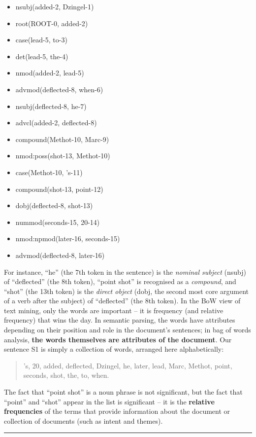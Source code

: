 \begin{itemize}[noitemsep]
\item nsubj(added-2, Dzingel-1)
\item root(ROOT-0, added-2)
\item case(lead-5, to-3)
\item det(lead-5, the-4)
\item nmod(added-2, lead-5)
\item advmod(deflected-8, when-6)
\item nsubj(deflected-8, he-7)
\item advcl(added-2, deflected-8)
\item compound(Methot-10, Marc-9)
\item nmod:poss(shot-13, Methot-10)
\item case(Methot-10, 's-11)
\item compound(shot-13, point-12)
\item dobj(deflected-8, shot-13)
\item nummod(seconds-15, 20-14)
\item nmod:npmod(later-16, seconds-15)
\item advmod(deflected-8, later-16)
\end{itemize}
For instance, ``he'' (the 7th token in the sentence) is the \textit{nominal subject} (nsubj) of ``deflected'' (the 8th token), ``point shot'' is recognised as a \textit{compound}, and ``shot'' (the 13th token) is the \textit{direct object} (dobj, the second most core argument of a verb after the subject) of ``deflected'' (the 8th token).
\newl In the BoW view of text mining, only the words are important -- it is frequency (and relative frequency) that wins the day. In semantic parsing, the words have attributes depending on their position and role in the document's sentences; in bag of words analysis, \textbf{the words themselves are attributes of the document}. Our sentence S1 is simply a collection of words, arranged here alphabetically: 
\begin{quote}
's, 20, added, deflected, Dzingel, he, later, lead, Marc, Methot, point, seconds, shot, the, to, when.  
\end{quote}
The fact that ``point shot'' is a noun phrase is not significant, but the fact that ``point'' and ``shot'' appear in the list is significant -- it is the \textbf{relative frequencies} of the terms that provide information about the document or collection of documents (such as intent and themes). \begin{center}\rule{0.5\linewidth}{.4pt}\end{center}
